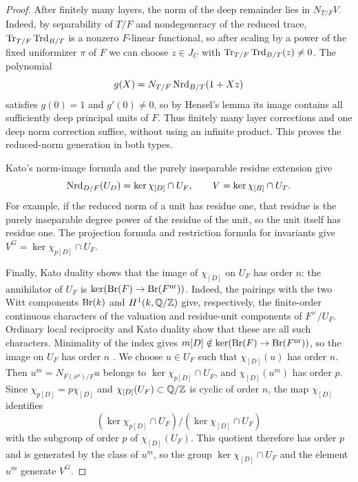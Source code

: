 \begin{proof}
After finitely many layers, the norm of the deep remainder lies in $N_{T/F}V$.
Indeed, by separability of $T/F$ and nondegeneracy of the reduced trace, $\operatorname{Tr}_{T/F}\operatorname{Trd}_{B/T}$ is a nonzero $F$-linear functional, so after scaling by a power of the fixed uniformizer $\pi$ of $F$ we can choose $z\in J_C$ with $\operatorname{Tr}_{T/F}\operatorname{Trd}_{B/T}(z)\ne0$.
The polynomial
\[
 g(X)=N_{T/F}\operatorname{Nrd}_{B/T}(1+Xz)
\]
satisfies $g(0)=1$ and $g'(0)\ne0$, so by Hensel's lemma its image contains all sufficiently deep principal units of $F$.
Thus finitely many layer corrections and one deep norm correction suffice, without using an infinite product.
This proves the reduced-norm generation in both types.

Kato's norm-image formula and the purely inseparable residue extension give
\[
 \operatorname{Nrd}_{D/F}(U_D)=\ker\chi_{[D]}\cap U_F,
 \qquad V=\ker\chi_{[B]}\cap U_T.
\]
For example, if the reduced norm of a unit has residue one, that residue is the purely inseparable degree power of the residue of the unit, so the unit itself has residue one.
The projection formula and restriction formula for invariants give $V^G=\ker\chi_{p[D]}\cap U_F$.

Finally, Kato duality shows that the image of $\chi_{[D]}$ on $U_F$ has order $n$: the annihilator of $U_F$ is $\ker(\operatorname{Br}(F)\to\operatorname{Br}(F^{\mathrm{nr}}))$.
Indeed, the pairings with the two Witt components $\operatorname{Br}(k)$ and $H^1(k,\mathbb Q/\mathbb Z)$ give, respectively, the finite-order continuous characters of the valuation and residue-unit components of $F^\times/U_F$.
Ordinary local reciprocity and Kato duality show that these are all such characters.
Minimality of the index gives $m[D]\notin\ker(\operatorname{Br}(F)\to\operatorname{Br}(F^{\mathrm{nr}}))$, so the image on $U_F$ has order $n$ \cite[Theorem 2]{KatoExistence}.
We choose $u\in U_F$ such that $\chi_{[D]}(u)$ has order $n$.
Then $u^m=N_{F(x^p)/F}u$ belongs to $\ker\chi_{p[D]}\cap U_F$, and $\chi_{[D]}(u^m)$ has order $p$.
Since $\chi_{p[D]}=p\chi_{[D]}$ and $\chi_{[D]}(U_F)\subset\mathbb Q/\mathbb Z$ is cyclic of order $n$, the map $\chi_{[D]}$ identifies
\[
 (\ker\chi_{p[D]}\cap U_F)/(\ker\chi_{[D]}\cap U_F)
\]
with the subgroup of order $p$ of $\chi_{[D]}(U_F)$.
This quotient therefore has order $p$ and is generated by the class of $u^m$, so the group $\ker\chi_{[D]}\cap U_F$ and the element $u^m$ generate $V^G$.
\end{proof}


